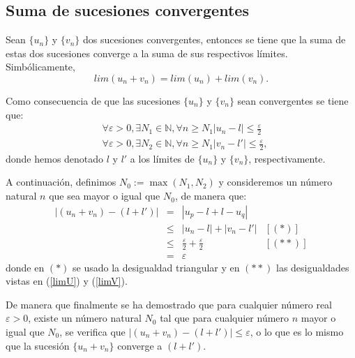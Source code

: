 
\subsection{Suma de sucesiones convergentes}

\begin{teorema}
  Sean \(\{u_n\}\) y \(\{v_n\}\) dos sucesiones convergentes, entonces
  se tiene que la suma de estas dos sucesiones converge a la suma de sus
  respectivos límites. Simbólicamente,
  \begin{equation}
  lim (u_n + v_n) = lim (u_n) + lim (v_n).
  \end{equation}
\end{teorema}

\begin{demostracion}
  Como consecuencia de que las sucesiones \(\{u_n\}\) y \(\{v_n\}\) sean
  convergentes se tiene que:
  \begin{align}
    & ∀ ε > 0, ∃ N_1 ∈ ℕ, ∀ n ≥ N_1 |u_n - l| ≤ \frac{ε}{2} \label{limU} \\
    & ∀ ε > 0, ∃ N_2 ∈ ℕ, ∀ n ≥ N_1 |v_n - l'| ≤ \frac{ε}{2}, \label{limV}
  \end{align}
  donde hemos denotado \(l\) y \(l'\) a los límites de \(\{u_n\}\) y
  \(\{v_n\}\), respectivamente.


  A continuación, definimos \(N_0 := \max(N_1,N_2)\) y consideremos un
  número natural \(n\) que sea mayor o igual que \(N_0\), de manera que:
  \[\begin{array}{llll}
      |(u_n+v_n)-(l+l')| &= &|u_p-l+l-u_q|           & \\
                         &≤ &|u_n-l|+|v_n-l'|        & [(*)] \\
                         &≤ &\frac{ε}{2}+\frac{ε}{2} & [(**)] \\
                         &= &ε
  \end{array}\]
  donde en \((*)\) se usado la desigualdad triangular y en \((**)\) las
  desigualdades vistas en (\ref{limU}) y (\ref{limV}).

  De manera que finalmente se ha demostrado que para cualquier número
  real \(ε > 0\), existe un número natural \(N_0\) tal que para
  cualquier número \(n\) mayor o igual que \(N_0\), se verifica que
  \(|(u_n+v_n)-(l+l')| ≤ ε\), o lo que es lo mismo que la sucesión
  \(\{u_n+v_n\}\) converge a \((l+l')\).
\end{demostracion}

